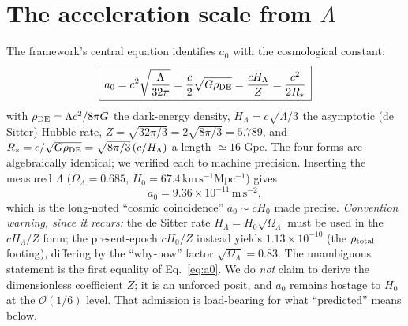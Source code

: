 \documentclass[aps,prd,twocolumn,10pt,nofootinbib,superscriptaddress]{revtex4-2}
\begin{document}
\section{The acceleration scale from $\Lambda$}
The framework's central equation identifies $a_0$ with the cosmological constant:
\begin{equation}
\boxed{\,a_0=c^2\sqrt{\frac{\Lambda}{32\pi}}=\frac{c}{2}\sqrt{G\rho_{\rm DE}}=\frac{cH_\Lambda}{Z}=\frac{c^2}{2R_*}\,}
\label{eq:a0}
\end{equation}
with $\rho_{\rm DE}=\Lambda c^2/8\pi G$ the dark-energy density, $H_\Lambda=c\sqrt{\Lambda/3}$ the asymptotic
(de Sitter) Hubble rate, $Z=\sqrt{32\pi/3}=2\sqrt{8\pi/3}=5.789$, and $R_*=c/\sqrt{G\rho_{\rm DE}}=\sqrt{8\pi/3}\,
(c/H_\Lambda)$ a length $\simeq16$ Gpc. The four forms are algebraically identical; we verified each to machine
precision. Inserting the measured $\Lambda$ ($\Omega_\Lambda=0.685$, $H_0=67.4\,\mathrm{km\,s^{-1}Mpc^{-1}}$) gives
\begin{equation}
a_0=9.36\times10^{-11}\,\mathrm{m\,s^{-2}},
\end{equation}
which is the long-noted ``cosmic coincidence'' $a_0\!\sim\!cH_0$ made precise. \emph{Convention warning, since it
recurs:} the de Sitter rate $H_\Lambda=H_0\sqrt{\Omega_\Lambda}$ must be used in the $cH_\Lambda/Z$ form; the
present-epoch $cH_0/Z$ instead yields $1.13\times10^{-10}$ (the $\rho_{\rm total}$ footing), differing by the
``why-now'' factor $\sqrt{\Omega_\Lambda}=0.83$. The unambiguous statement is the first equality of
Eq.~\eqref{eq:a0}. We do \emph{not} claim to derive the dimensionless coefficient $Z$; it is an unforced posit,
and $a_0$ remains hostage to $H_0$ at the $\mathcal{O}(1/6)$ level. That admission is load-bearing for what
``predicted'' means below.
\end{document}
